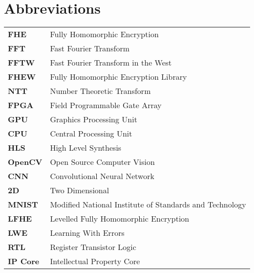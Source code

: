\documentclass[12pt,twoside]{report}
\begin{document}

{}
\tableofcontents
\listoffigures
\listoftables
\renewcommand{\lstlistlistingname}{List of Source Codes}
\lstlistoflistings

\chapter*{Abbreviations}
\begin{table}[h]
\begin{tabular}{m{3cm} m{15cm}}
\textbf{FHE} & Fully Homomorphic Encryption\\
\vspace{0.25cm}
\textbf{FFT} &  Fast Fourier Transform\\
\vspace{0.25cm}
\textbf{FFTW} & Fast Fourier Transform in the West\\
\vspace{0.25cm}
\textbf{FHEW} & Fully Homomorphic Encryption Library\\
\vspace{0.25cm}
\textbf{NTT} & Number Theoretic Transform\\
\vspace{0.25cm}
\textbf{FPGA} & Field Programmable Gate Array\\
\vspace{0.25cm}
\textbf{GPU} & Graphics Processing Unit\\
\vspace{0.25cm}
\textbf{CPU} & Central Processing Unit\\
\vspace{0.25cm}
\textbf{HLS} & High Level Synthesis\\
\vspace{0.25cm}
\textbf{OpenCV} & Open Source Computer Vision\\
\vspace{0.25cm}
\textbf{CNN} & Convolutional Neural Network\\
\vspace{0.25cm}
\textbf{2D} & Two Dimensional\\
\vspace{0.25cm}
\textbf{MNIST} & Modified National Institute of Standards and Technology\\
\vspace{0.25cm}
\textbf{LFHE} & Levelled Fully Homomorphic Encryption\\
\vspace{0.25cm}
\textbf{LWE}  & Learning With Errors\\
\vspace{0.25cm}
\textbf{RTL}  & Register Transistor Logic\\
\vspace{0.25cm}
\textbf{IP Core}  &  Intellectual Property Core\\
\end{tabular}
\end{table}
 
\end{document}
